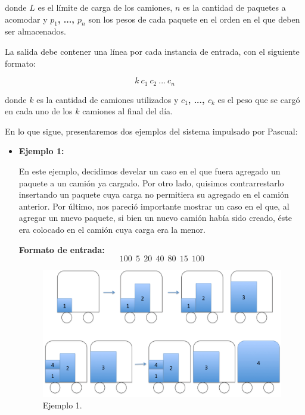 donde \textbf{$L$} es el límite de carga de los camiones, \textbf{$n$} es la cantidad de paquetes a acomodar y \textbf{$p_{1}$, ..., $p_{n}$} son los pesos de cada paquete en el orden en el que deben ser almacenados.\newline

La salida debe contener una línea por cada instancia de entrada, con el siguiente formato:

$$k\ c_{1}\ c_{2}\ ...\ c_{n}$$


donde \textbf{$k$} es la cantidad de camiones utilizados y \textbf{$c_{1}$, ..., $c_{k}$} es el peso que se cargó en cada uno de los \textbf{$k$} camiones al final del día.\newline

En lo que sigue, presentaremos dos ejemplos del sistema impulsado por Pascual:
\begin{itemize}
\item {\large{\textbf{Ejemplo 1:}}}\newline

En este ejemplo, decidimos develar un caso en el que fuera agregado un paquete a un camión ya cargado. Por otro lado, quisimos contrarrestarlo insertando un paquete cuya carga no permitiera su agregado en el camión anterior. Por último, nos pareció importante mostrar un caso en el que, al agregar un nuevo paquete, si bien un nuevo camión había sido creado, éste era colocado en el camión cuya carga era la menor.\newline

\textbf{Formato de entrada:}
$$100\ \ 5\ \ 20\ \ 40\ \ 80\ \ 15\ \ 100$$

\begin{figure}[H] %
\begin{center}
\includegraphics[width=320pt]{../imgs/ejemplo1.jpg}
\caption{Ejemplo 1.}
\end{center}
\end{figure}


\end{itemize}
